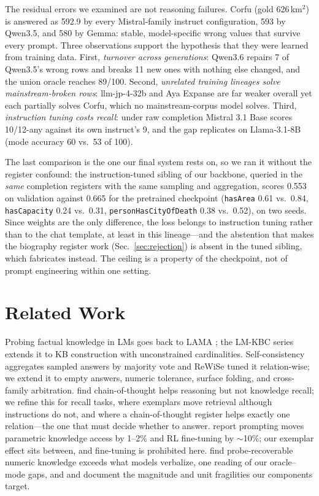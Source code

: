 \documentclass[11pt]{article}
\begin{document}
The residual errors we examined are not reasoning failures. Corfu (gold
626\,km$^2$) is answered as 592.9 by every Mistral-family instruct
configuration, 593 by Qwen3.5, and 580 by Gemma: stable, model-specific
wrong values that survive every prompt. Three observations support the
hypothesis that they were learned from training data. First,
\emph{turnover across generations}: Qwen3.6 repairs 7 of Qwen3.5's wrong
rows and breaks 11 new ones with nothing else changed, and the union
oracle reaches 89/100. Second, \emph{unrelated training lineages solve
mainstream-broken rows}: llm-jp-4-32b and Aya Expanse are far weaker
overall yet each partially solves Corfu, which no mainstream-corpus
model solves. Third, \emph{instruction tuning costs recall}: under
raw completion Mistral 3.1 Base scores 10/12-any against its own
instruct's 9, and the gap replicates on Llama-3.1-8B (mode accuracy 60
vs.\ 53 of 100).

The last comparison is the one our final system rests on, so we ran it
without the register confound: the instruction-tuned sibling of our
backbone, queried in the \emph{same} completion registers with the same
sampling and aggregation, scores 0.553 on validation against 0.665 for
the pretrained checkpoint (\texttt{hasArea} 0.61 vs.\ 0.84,
\texttt{hasCapacity} 0.24 vs.\ 0.31, \texttt{personHasCityOfDeath} 0.38
vs.\ 0.52), on two seeds. Since weights are the only difference, the loss
belongs to instruction tuning rather than to the chat template, at least
in this lineage---and the abstention that makes the biography register
work (Sec.~\ref{sec:rejection}) is absent in the tuned sibling, which
fabricates instead. The ceiling is a property of the checkpoint, not of
prompt engineering within one setting.

\section{Related Work}

Probing factual knowledge in LMs goes back to LAMA
\citep{petroni2019lama}; the LM-KBC series \citep{lmkbc2023,lmkbc2024}
extends it to KB construction with unconstrained cardinalities.
Self-consistency \citep{wang2023selfconsistency} aggregates sampled
answers by majority vote and ReWiSe \citep{albertroulhac2025rewise} tuned
it relation-wise; we extend it to empty answers, numeric tolerance,
surface folding, and cross-family arbitration.
\citet{sprague2025cot} find chain-of-thought helps reasoning but not
knowledge recall; we refine this for recall tasks, where exemplars move
retrieval although instructions do not, and where a chain-of-thought
register helps exactly one relation---the one that must decide whether to
answer. \citet{ma2026parametric} report prompting moves parametric
knowledge access by 1--2\% and RL fine-tuning by $\sim$10\%; our exemplar
effect sits between, and fine-tuning is prohibited here.
\citet{numbers2025know} find probe-recoverable numeric knowledge exceeds
what models verbalize, one reading of our oracle--mode gaps, and
\citet{kalyan2021fermi} and \citet{park2022measurements} document the
magnitude and unit fragilities our components target.
\end{document}
